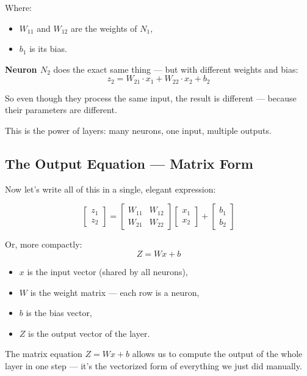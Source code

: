 \documentclass[11pt]{article}
\begin{document}
Where:
\begin{itemize}
  \item $W_{11}$ and $W_{12}$ are the weights of $N_1$,
  \item $b_1$ is its bias.
\end{itemize}

\textbf{Neuron $N_2$} does the exact same thing — but with different weights and bias:
\[
z_2 = W_{21} \cdot x_1 + W_{22} \cdot x_2 + b_2
\]

So even though they process the same input, the result is different — because their parameters are different.

This is the power of layers: many neurons, one input, multiple outputs.

\subsection{The Output Equation — Matrix Form}

Now let’s write all of this in a single, elegant expression:

\[
\begin{bmatrix}
z_1 \\
z_2
\end{bmatrix}
=
\begin{bmatrix}
W_{11} & W_{12} \\
W_{21} & W_{22}
\end{bmatrix}
\begin{bmatrix}
x_1 \\
x_2
\end{bmatrix}
+
\begin{bmatrix}
b_1 \\
b_2
\end{bmatrix}
\]

Or, more compactly:
\[
Z = W x + b
\]

\begin{defbox}[title=Notation Guide]
\begin{itemize}
  \item $x$ is the input vector (shared by all neurons),
  \item $W$ is the weight matrix — each row is a neuron,
  \item $b$ is the bias vector,
  \item $Z$ is the output vector of the layer.
\end{itemize}
\end{defbox}

\begin{insightbox}[title=Key Insight]
The matrix equation $Z = Wx + b$ allows us to compute the output of the whole layer in one step —  
it’s the vectorized form of everything we just did manually.
\end{insightbox}
\end{document}
